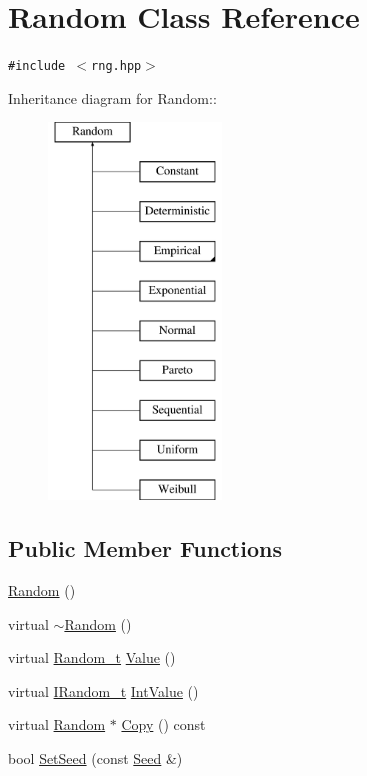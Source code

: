 \hypertarget{classRandom}{
\section{Random Class Reference}
\label{classRandom}
}
{\tt \#include $<$rng.hpp$>$}

Inheritance diagram for Random::\begin{figure}[H]
\begin{center}
\leavevmode
\includegraphics[height=10cm]{classRandom}
\end{center}
\end{figure}
\subsection*{Public Member Functions}
\begin{CompactItemize}
\item 
\hyperlink{classRandom_cb76b49c3903a3c4fb67fd216341f08d}{Random} ()
\item 
virtual \hyperlink{classRandom_488c376fe5b7430d5551e44eead99e36}{$\sim$Random} ()
\item 
virtual \hyperlink{rng_8hpp_ad41e7f5d86b1109b6a6a032c86cdd3f}{Random\_\-t} \hyperlink{classRandom_4d1c2876c5c78104186e241209d0e11e}{Value} ()
\item 
virtual \hyperlink{rng_8hpp_eb0f2eb55a063defa69eab89c6c0f695}{IRandom\_\-t} \hyperlink{classRandom_9ac522e9fe39aefd2cddd88554184b1a}{IntValue} ()
\item 
virtual \hyperlink{classRandom}{Random} $\ast$ \hyperlink{classRandom_22b2951acd2008e8ff58fae434ab7ac5}{Copy} () const 
\item 
bool \hyperlink{classRandom_afb76e3ca095211f6b527848d46ef24d}{SetSeed} (const \hyperlink{classSeed}{Seed} \&)
\end{CompactItemize}

